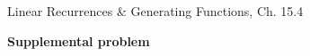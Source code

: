 \documentclass[handout]{mcs}
\begin{document}

\begin{staffnotes}
Linear Recurrences \& Generating Functions, Ch. 15.4
\end{staffnotes}






\begin{center}
\textbf{\large Supplemental problem}
\end{center}





\end{document}
